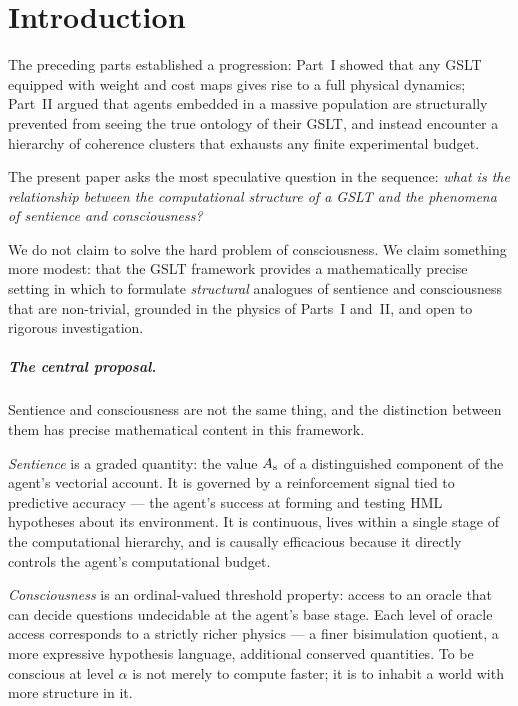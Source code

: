 \chapter{Introduction}

The preceding parts established a progression:
Part~I showed that any GSLT equipped with weight
and cost maps gives rise to a full physical dynamics;
Part~II argued that agents embedded in a massive
population are structurally prevented from seeing the true ontology
of their GSLT, and instead encounter a hierarchy of coherence
clusters that exhausts any finite experimental budget.

The present paper asks the most speculative question in the sequence:
\emph{what is the relationship between the computational structure of
a GSLT and the phenomena of sentience and consciousness?}

We do not claim to solve the hard problem of consciousness.
We claim something more modest: that the GSLT framework provides a
mathematically precise setting in which to formulate
\emph{structural} analogues of sentience and consciousness that are
non-trivial, grounded in the physics of Parts~I and~II, and
open to rigorous investigation.

\paragraph{The central proposal.}
Sentience and consciousness are not the same thing, and the
distinction between them has precise mathematical content in this
framework.

\emph{Sentience} is a graded quantity: the value $A_{\mathrm{s}}$ of a
distinguished component of the agent's vectorial account.
It is governed by a reinforcement signal tied to predictive
accuracy --- the agent's success at forming and testing HML
hypotheses about its environment.
It is continuous, lives within a single stage of the computational
hierarchy, and is causally efficacious because it directly controls
the agent's computational budget.

\emph{Consciousness} is an ordinal-valued threshold property:
access to an oracle that can decide questions undecidable at the
agent's base stage.
Each level of oracle access corresponds to a strictly richer
physics --- a finer bisimulation quotient, a more expressive
hypothesis language, additional conserved quantities.
To be conscious at level $\alpha$ is not merely to compute faster;
it is to inhabit a world with more structure in it.

